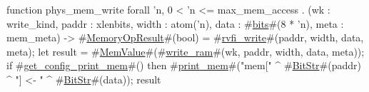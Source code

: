function phys_mem_write forall 'n, 0 < 'n <= max_mem_access . (wk : write_kind, paddr : xlenbits, width : atom('n), data : #\hyperref[sailRISCVzbits]{bits}#(8 * 'n), meta : mem_meta) -> #\hyperref[sailRISCVzMemoryOpResult]{MemoryOpResult}#(bool) = {
  #\hyperref[sailRISCVzrvfizywrite]{rvfi\_write}#(paddr, width, data, meta);
  let result = #\hyperref[sailRISCVzMemValue]{MemValue}#(#\hyperref[sailRISCVzwritezyram]{write\_ram}#(wk, paddr, width, data, meta));
  if   #\hyperref[sailRISCVzgetzyconfigzyprintzymem]{get\_config\_print\_mem}#()
  then #\hyperref[sailRISCVzprintzymem]{print\_mem}#("mem[" ^ #\hyperref[sailRISCVzBitStr]{BitStr}#(paddr) ^ "] <- " ^ #\hyperref[sailRISCVzBitStr]{BitStr}#(data));
  result
}
